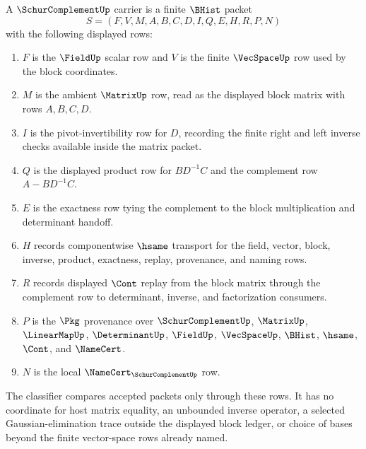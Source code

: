 \begin{definition}
\label{def:schur-complement-carrier}
A $\SchurComplementUp$ carrier is a finite $\BHist$ packet
$$
S=(F,V,M,A,B,C,D,I,Q,E,H,R,P,N)
$$
with the following displayed rows:
\begin{enumerate}
\item $F$ is the $\FieldUp$ scalar row and $V$ is the finite $\VecSpaceUp$ row used by the block coordinates.
\item $M$ is the ambient $\MatrixUp$ row, read as the displayed block matrix with rows $A,B,C,D$.
\item $I$ is the pivot-invertibility row for $D$, recording the finite right and left inverse checks available inside the matrix packet.
\item $Q$ is the displayed product row for $B D^{-1} C$ and the complement row $A-BD^{-1}C$.
\item $E$ is the exactness row tying the complement to the block multiplication and determinant handoff.
\item $H$ records componentwise $\hsame$ transport for the field, vector, block, inverse, product, exactness, replay, provenance, and naming rows.
\item $R$ records displayed $\Cont$ replay from the block matrix through the complement row to determinant, inverse, and factorization consumers.
\item $P$ is the $\Pkg$ provenance over $\SchurComplementUp$, $\MatrixUp$, $\LinearMapUp$, $\DeterminantUp$, $\FieldUp$, $\VecSpaceUp$, $\BHist$, $\hsame$, $\Cont$, and $\NameCert$.
\item $N$ is the local $\NameCert_{\SchurComplementUp}$ row.
\end{enumerate}
The classifier compares accepted packets only through these rows. It has no coordinate for host matrix equality, an unbounded inverse operator, a selected Gaussian-elimination trace outside the displayed block ledger, or choice of bases beyond the finite vector-space rows already named.
\end{definition}

